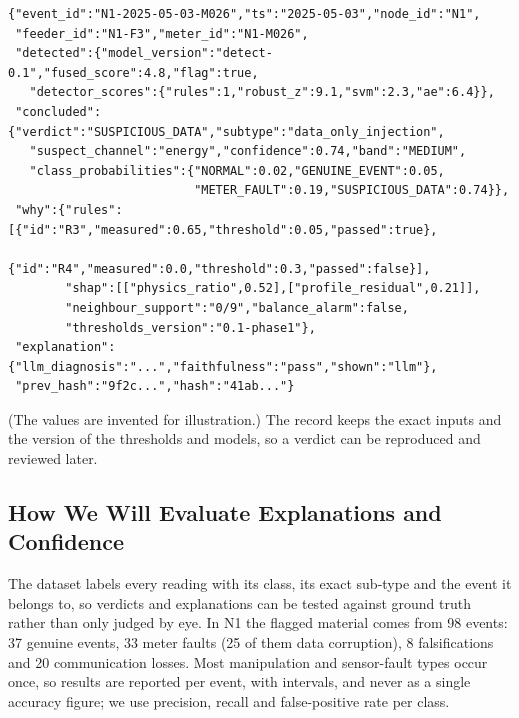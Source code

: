 \begin{lstlisting}
{"event_id":"N1-2025-05-03-M026","ts":"2025-05-03","node_id":"N1",
 "feeder_id":"N1-F3","meter_id":"N1-M026",
 "detected":{"model_version":"detect-0.1","fused_score":4.8,"flag":true,
   "detector_scores":{"rules":1,"robust_z":9.1,"svm":2.3,"ae":6.4}},
 "concluded":{"verdict":"SUSPICIOUS_DATA","subtype":"data_only_injection",
   "suspect_channel":"energy","confidence":0.74,"band":"MEDIUM",
   "class_probabilities":{"NORMAL":0.02,"GENUINE_EVENT":0.05,
                          "METER_FAULT":0.19,"SUSPICIOUS_DATA":0.74}},
 "why":{"rules":[{"id":"R3","measured":0.65,"threshold":0.05,"passed":true},
                 {"id":"R4","measured":0.0,"threshold":0.3,"passed":false}],
        "shap":[["physics_ratio",0.52],["profile_residual",0.21]],
        "neighbour_support":"0/9","balance_alarm":false,
        "thresholds_version":"0.1-phase1"},
 "explanation":{"llm_diagnosis":"...","faithfulness":"pass","shown":"llm"},
 "prev_hash":"9f2c...","hash":"41ab..."}
\end{lstlisting}
(The values are invented for illustration.) The record keeps the exact inputs and the version of the
thresholds and models, so a verdict can be reproduced and reviewed later.

\subsection{How We Will Evaluate Explanations and Confidence}
\label{g2-sec:evaluation}
The dataset labels every reading with its class, its exact sub-type and the event it belongs to, so verdicts
and explanations can be tested against ground truth rather than only judged by eye. In N1 the flagged
material comes from 98 events: 37 genuine events, 33 meter faults (25 of them data corruption), 8
falsifications and 20 communication losses. Most manipulation and sensor-fault types occur once, so results are
reported per event, with intervals, and never as a single accuracy figure; we use precision, recall and
false-positive rate per class.

